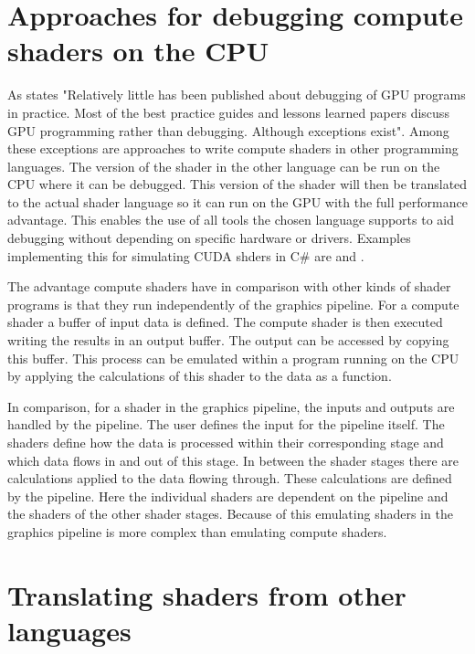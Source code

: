 \section{Approaches for debugging compute shaders on the CPU}
\label{section:computeApproaches}

As  states "Relatively little has been published about debugging of GPU programs  in  practice.  Most  of  the  best  practice  guides  and lessons learned papers discuss GPU programming rather than debugging. Although exceptions exist". Among these exceptions are approaches to write compute shaders in other programming languages. The version of the shader in the other language can be run on the CPU where it can be debugged. This version of the shader will then be translated to the actual shader language so it can run on the GPU with the full performance advantage. This enables the use of all tools the chosen language supports to aid debugging without depending on specific hardware or drivers.
Examples implementing this for simulating CUDA shders in C\# are  and .

The advantage compute shaders have in comparison with other kinds of shader programs is that they run independently of the graphics pipeline. For a compute shader a buffer of input data is defined. The compute shader is then executed writing the results in an output buffer. The output can be accessed by copying this buffer. This process can be emulated within a program running on the CPU by applying the calculations of this shader to the data as a function.

In comparison, for a shader in the graphics pipeline, the inputs and outputs are handled by the pipeline. The user defines the input for the pipeline itself. The shaders define how the data is processed within their corresponding stage and which data flows in and out of this stage. In between the shader stages there are calculations applied to the data flowing through. These calculations are defined by the pipeline. Here the individual shaders are dependent on the pipeline and the shaders of the other shader stages. Because of this emulating shaders in the graphics pipeline is more complex than emulating compute shaders.

\newpage

\section{Translating shaders from other languages}\label{section:translating}

